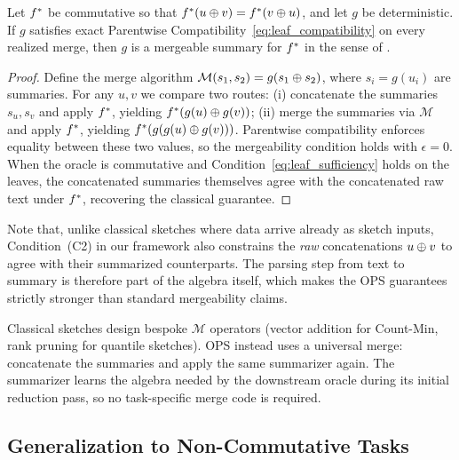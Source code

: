 \begin{proposition}
\label{prop:mergeable_reduction}
Let $f^{\ast}$ be commutative so that $f^{\ast}(u\oplus v)=f^{\ast}(v\oplus u)$, and let $g$ be deterministic. If $g$ satisfies exact Parentwise Compatibility~\eqref{eq:leaf_compatibility} on every realized merge, then $g$ is a mergeable summary for $f^{\ast}$ in the sense of \citet{Agarwal2013MergeableTODS}.
\end{proposition}

\begin{proof}
Define the merge algorithm $\mathcal{M}(s_1,s_2)=g(s_1\oplus s_2)$, where $s_i=g(u_i)$ are summaries. For any $u,v$ we compare two routes: (i) concatenate the summaries $s_u,s_v$ and apply $f^{\ast}$, yielding $f^{\ast}(g(u)\oplus g(v))$; (ii) merge the summaries via $\mathcal{M}$ and apply $f^{\ast}$, yielding $f^{\ast}(g(g(u)\oplus g(v)))$. Parentwise compatibility enforces equality between these two values, so the mergeability condition holds with $\epsilon=0$. When the oracle is commutative and Condition~\eqref{eq:leaf_sufficiency} holds on the leaves, the concatenated summaries themselves agree with the concatenated raw text under $f^{\ast}$, recovering the classical guarantee.
\end{proof}

Note that, unlike classical sketches where data arrive already as sketch inputs, Condition~(C2) in our framework also constrains the \emph{raw} concatenations $u\oplus v$ to agree with their summarized counterparts. The parsing step from text to summary is therefore part of the algebra itself, which makes the OPS guarantees strictly stronger than standard mergeability claims.

\begin{remark}\label{rem:universal_merge}
Classical sketches design bespoke $\mathcal{M}$ operators (vector addition for Count-Min, rank pruning for quantile sketches). OPS instead uses a universal merge: concatenate the summaries and apply the same summarizer again. The summarizer learns the algebra needed by the downstream oracle during its initial reduction pass, so no task-specific merge code is required.
\end{remark}

\subsection{Generalization to Non-Commutative Tasks}

